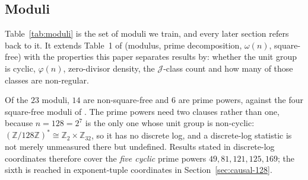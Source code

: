 \subsection{Moduli}
\label{sec:setup-moduli}

Table~\ref{tab:moduli} is the set of moduli we train, and every later section refers back to
it. It extends Table~1 of \citet{chen2026multiplication} (modulus, prime decomposition,
$\omega(n)$, square-free) with the properties this paper separates results by: whether the
unit group is cyclic, $\varphi(n)$, zero-divisor density, the $\mathcal{J}$-class count and how
many of those classes are non-regular.

Of the $23$ moduli, $14$ are non-square-free and $6$ are prime powers, against the four
square-free moduli of \citet{chen2026multiplication}. The prime powers need two clauses rather
than one, because $n = 128 = 2^{7}$ is the only one whose unit group is non-cyclic:
$(\mathbb{Z}/128\mathbb{Z})^{*} \cong \mathbb{Z}_{2} \times \mathbb{Z}_{32}$, so it has no
discrete log, and a discrete-log statistic is not merely unmeasured there but undefined.
Results stated in discrete-log coordinates therefore cover the \emph{five cyclic} prime powers
$49, 81, 121, 125, 169$; the sixth is reached in exponent-tuple coordinates in
Section~\ref{sec:causal-128}.


